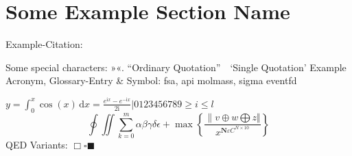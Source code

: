 



\section{Some Example Section Name}

Example-Citation:
\cite{DenKr_denkrement1_indeco}

\npi%
Some special characters:
»«.
\nl%
\nl
\enquote{Ordinary Quotation}\ \ \enquote*{Single Quotation}
\nl%
Example Acronym, Glossary-Entry \& Symbol:\nl
\gls{fsa}, \gls{api}\nl
\gls{molmass}, \gls{sigma}\nl
\gls{eventfd}

\np
\providecommand{\showcaseMathString}{}%
\newcommand{\I}{\mathrm{i}}
$y = \int_0^x\cos(x)\,\mathrm{d}{x} = \frac{e^{\I x} - e^{-\I x}}{2\I} | 0123456789 \geq i \leqslant l$
\nl
\begin{equation}
\oint \iint \sum_{k=0}^{m} \alpha \beta \gamma \delta \epsilon + \max \left\{ \frac{\| v\oplus w\bigoplus z \Vert}{x^{\mathbf{N} \varepsilon {C}^{N\times 10}}} \right\}%
\end{equation}\nl
QED Variants: $\Box \square \blacksquare$ %




